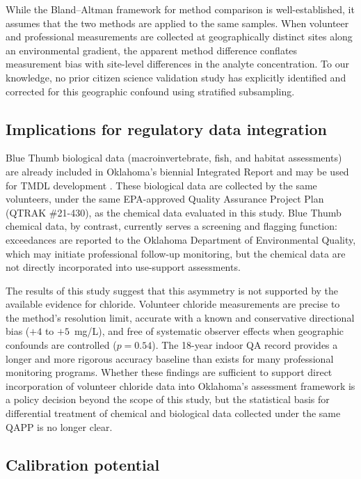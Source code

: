 \documentclass[lineno]{wlpeerj}
\begin{document}
While the Bland--Altman framework for method comparison \citep{BlandAltman1986} is well-established, it assumes that the two methods are applied to the same samples. When volunteer and professional measurements are collected at geographically distinct sites along an environmental gradient, the apparent method difference conflates measurement bias with site-level differences in the analyte concentration. To our knowledge, no prior citizen science validation study has explicitly identified and corrected for this geographic confound using stratified subsampling.

\subsection{Implications for regulatory data integration}

Blue Thumb biological data (macroinvertebrate, fish, and habitat assessments) are already included in Oklahoma's biennial Integrated Report and may be used for TMDL development \citep{OCC2019}. These biological data are collected by the same volunteers, under the same EPA-approved Quality Assurance Project Plan (QTRAK \#21-430), as the chemical data evaluated in this study. Blue Thumb chemical data, by contrast, currently serves a screening and flagging function: exceedances are reported to the Oklahoma Department of Environmental Quality, which may initiate professional follow-up monitoring, but the chemical data are not directly incorporated into use-support assessments.

The results of this study suggest that this asymmetry is not supported by the available evidence for chloride. Volunteer chloride measurements are precise to the method's resolution limit, accurate with a known and conservative directional bias ($+4$ to $+5$~mg/L), and free of systematic observer effects when geographic confounds are controlled ($p = 0.54$). The 18-year indoor QA record provides a longer and more rigorous accuracy baseline than exists for many professional monitoring programs. Whether these findings are sufficient to support direct incorporation of volunteer chloride data into Oklahoma's assessment framework is a policy decision beyond the scope of this study, but the statistical basis for differential treatment of chemical and biological data collected under the same QAPP is no longer clear.

\subsection{Calibration potential}
\end{document}
